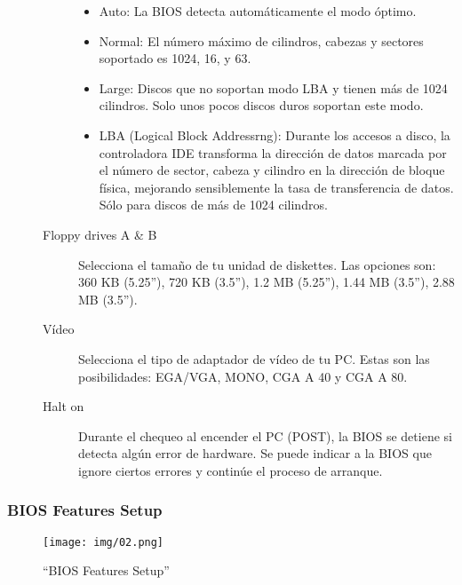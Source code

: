 \begin{description}
\begin{description}
						\begin{itemize}
							\item Auto: La BIOS detecta automáticamente el modo
								óptimo.  \item Normal: El número máximo de
								cilindros, cabezas y sectores soportado es
								1024, 16, y 63.
							\item Large: Discos que no soportan modo LBA y
								tienen más de 1024 cilindros. Solo unos pocos
								discos duros soportan este modo.
							\item LBA (Logical Block Addressrng): Durante los
								accesos a disco, la controladora IDE transforma
								la dirección de datos marcada por el número de
								sector, cabeza y cilindro en la dirección de
								bloque física, mejorando sensiblemente la tasa
								de transferencia de datos. Sólo para discos de
								más de 1024 cilindros.
						\end{itemize}
					\item[Floppy drives A \& B] Selecciona el tamaño de tu
						unidad de diskettes. Las opciones son: 360 KB (5.25”),
						720 KB (3.5”), 1.2 MB (5.25”), 1.44 MB (3.5”), 2.88 MB
						(3.5”).
					\item[Vídeo] Selecciona el tipo de adaptador de
						vídeo de tu PC. Estas son las posibilidades: EGA/VGA,
						MONO, CGA A 40 y CGA A 80.
					\item[Halt on] Durante el chequeo al encender el PC (POST),
						la BIOS se detiene si detecta algún error de hardware.
						Se puede indicar a la BIOS que ignore ciertos errores y
						continúe el proceso de arranque.

					\end{description}
				\end{description}

		\subsubsection{BIOS Features Setup}{\label{sub:bios features setup}}
			\begin{figure}[H]
				\centering
					\texttt{[image: img/02.png]}
				\caption{``BIOS Features Setup''}
			\end{figure}
			
